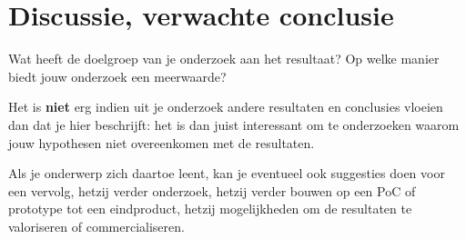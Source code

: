 \documentclass{hogent-article}
\begin{document}
\section{Discussie, verwachte conclusie}%
\label{sec:discussie-conclusie}

Wat heeft de doelgroep van je onderzoek aan het resultaat? Op welke manier biedt jouw onderzoek een meerwaarde?

Het is \textbf{niet} erg indien uit je onderzoek andere resultaten en conclusies vloeien dan dat je hier beschrijft: het is dan juist interessant om te onderzoeken waarom jouw hypothesen niet overeenkomen met de resultaten.

Als je onderwerp zich daartoe leent, kan je eventueel ook suggesties doen voor een vervolg, hetzij verder onderzoek, hetzij verder bouwen op een PoC of prototype tot een eindproduct, hetzij mogelijkheden om de resultaten te valoriseren of commercialiseren.


\printbibliography[heading=bibintoc]
\end{document}
